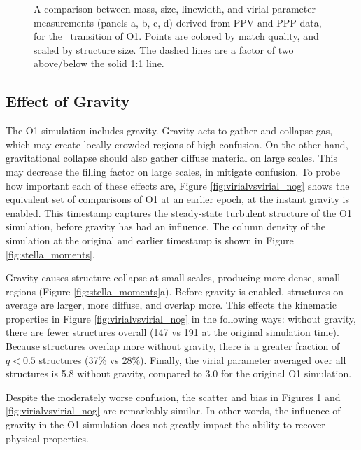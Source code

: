 \begin{figure}[htbp]
\caption{A comparison between mass, size, linewidth, and virial parameter measurements (panels a, b, c, d) derived from PPV and PPP data, for the \coc\, transition of O1. Points are colored by match quality, and scaled by structure size. The dashed lines are a factor of two above/below the solid 1:1 line.}
\label{fig:virialvsvirial}
\end{figure}

\subsection{Effect of Gravity}

The O1 simulation includes gravity. Gravity acts to gather and collapse gas, which may create locally crowded regions of high confusion. On the other hand, gravitational collapse should also gather diffuse material on large scales. This may decrease the filling factor on large scales, in mitigate confusion. To probe how important each of these effects are, Figure \ref{fig:virialvsvirial_nog} shows the equivalent set of comparisons of O1 at an earlier epoch, at the instant gravity is enabled. This timestamp captures the steady-state turbulent structure of the O1 simulation, before gravity has had an influence. The column density of the simulation at the original and earlier timestamp is shown in Figure \ref{fig:stella_moments}.

Gravity causes structure collapse at small scales, producing more dense, small regions (Figure \ref{fig:stella_moments}a). Before gravity is enabled, structures on average are larger, more diffuse, and overlap more. This effects the kinematic properties in Figure \ref{fig:virialvsvirial_nog} in the following ways: without gravity, there are fewer structures overall (147 vs 191 at the original simulation time). Because structures overlap more without gravity, there is a greater fraction of $q < 0.5$ structures (37\% vs 28\%). Finally, the virial parameter averaged over all structures is 5.8 without gravity, compared to 3.0 for the original O1 simulation.

Despite the moderately worse confusion, the scatter and bias in Figures \ref{fig:virialvsvirial} and \ref{fig:virialvsvirial_nog} are remarkably similar. In other words, the influence of gravity in the O1 simulation does not greatly impact the ability to recover physical properties.

